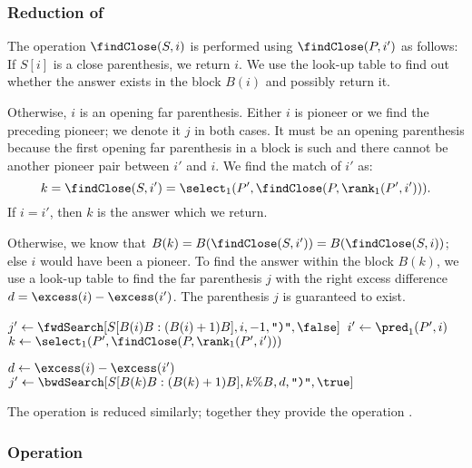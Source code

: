 \subsubsection{Reduction of \findClose}

The operation $\findClose(S, i)$ is performed using $\findClose(P, i')$ as follows:
If $S[i]$ is a close parenthesis, we return $i$.
We use the look-up table to find out whether the answer exists in the block $B(i)$ and possibly return it.

Otherwise, $i$ is an opening far parenthesis.
Either $i$ is pioneer or we find the preceding pioneer; we denote it $j$ in both cases.
It must be an opening parenthesis because the first opening far parenthesis in a block is such and there cannot be another pioneer pair between $i'$ and $i$.
We find the match of $i'$ as:
$$ k = \findClose(S, i') = \select_1(P', \findClose(P, \rank_1(P', i'))). $$
If $i = i'$, then $k$ is the answer which we return.

Otherwise, we know that $B(k) = B(\findClose(S, i')) = B(\findClose(S, i))$; else $i$ would have been a pioneer.
To find the answer within the block $B(k)$, we use a look-up table \bwdSearch{} to find the far parenthesis $j$ with the right excess difference $d = \excess(i) - \excess(i')$.
The parenthesis $j$ is guaranteed to exist.

\begin{algorithm}
\begin{algorithmic}
		\State {}
	\Else
		\State $j' \gets \fwdSearch[S[B(i)B: (B(i) + 1)B], i, -1, \closingParen, \false]$
			\State {} 
		\Else
			\State $i' \gets \pred_1(P', i)$
			\State $k \gets \select_1(P', \findClose(P, \rank_1(P', i')))$ 

			\State $d \gets \excess(i) - \excess(i')$
			\State $j' \gets \bwdSearch[S[B(k)B: (B(k) + 1)B], k \% B, d, \closingParen, \true]$
			\State {}
		\EndIf
	\EndIf
\EndFunction
\end{algorithmic}
\end{algorithm}

The operation \findOpen{} is reduced similarly; together they provide the operation \match{}.

\subsubsection{Operation \enclose}

